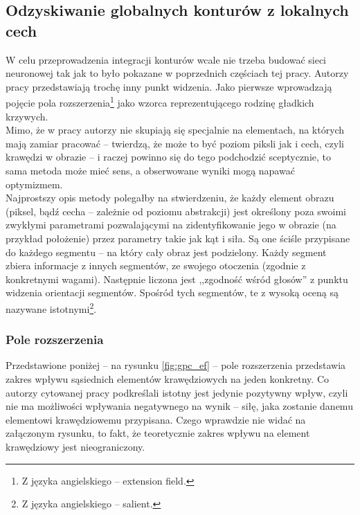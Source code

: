 \subsection{Odzyskiwanie globalnych konturów z lokalnych cech}
\label{integracjaGPC}

W celu przeprowadzenia integracji konturów wcale nie trzeba budować sieci neuronowej tak jak to było pokazane w poprzednich częściach tej pracy. Autorzy pracy \cite{Guy1993} przedstawiają trochę inny punkt widzenia. Jako pierwsze wprowadzają pojęcie pola rozszerzenia\footnote{Z języka angielskiego -- extension field.} jako wzorca reprezentującego rodzinę gładkich krzywych.\\

Mimo, że w pracy autorzy nie skupiają się specjalnie na elementach, na których mają zamiar pracować -- twierdzą, że może to być poziom piksli jak i cech, czyli krawędzi w obrazie -- i raczej powinno się do tego podchodzić sceptycznie, to sama metoda może mieć sens, a obserwowane wyniki mogą napawać optymizmem.\\

Najprostszy opis metody polegałby na stwierdzeniu, że każdy element obrazu (piksel, bądź cecha -- zależnie od poziomu abstrakcji) jest określony poza swoimi zwykłymi parametrami pozwalającymi na zidentyfikowanie jego w obrazie (na przykład położenie) przez parametry takie jak kąt i siła. Są one ściśle przypisane do każdego segmentu -- na który cały obraz jest podzielony. Każdy segment zbiera informacje z innych segmentów, ze swojego otoczenia (zgodnie z konkretnymi wagami). Następnie liczona jest ,,zgodność wśród głosów'' z punktu widzenia orientacji segmentów. Spośród tych segmentów, te z wysoką oceną są nazywane istotnymi\footnote{Z języka angielskiego -- salient.}.\\

\subsubsection{Pole rozszerzenia}
\label{GPC_extensionField}

Przedstawione poniżej -- na rysunku \ref{fig:gpc_ef} -- pole rozszerzenia przedstawia zakres wpływu sąsiednich elementów krawędziowych na jeden konkretny. Co autorzy cytowanej pracy podkreślali istotny jest jedynie pozytywny wpływ, czyli nie ma możliwości wpływania negatywnego na wynik -- siłę, jaka zostanie danemu elementowi krawędziowemu przypisana. Czego wprawdzie nie widać na załączonym rysunku, to fakt, że teoretycznie zakres wpływu na element krawędziowy jest nieograniczony. \\

